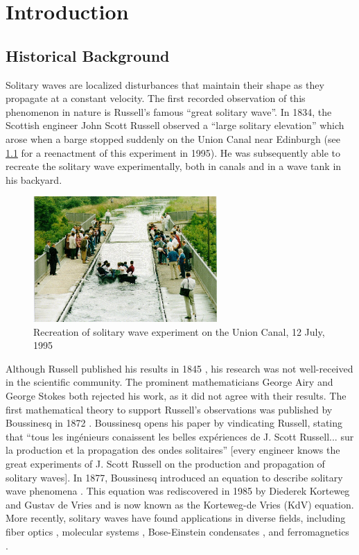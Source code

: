\documentclass[thesis.tex]{subfiles}
\begin{document}
\iffulldocument\else
	\chapter{Introduction}
\fi

\section{Historical Background}

Solitary waves are localized disturbances that maintain their shape as they propagate at a constant velocity. The first recorded observation of this phenomenon in nature is Russell's famous ``great solitary wave''. In 1834, the Scottish engineer John Scott Russell observed a ``large solitary elevation'' which arose when a barge stopped suddenly on the Union Canal near Edinburgh (see \cref{fig:canalwave} for a reenactment of this experiment in 1995). He was subsequently able to recreate the solitary wave experimentally, both in canals and in a wave tank in his backyard.  
\begin{figure}
\begin{center}
\includegraphics[width=7cm]{images/intro/solitonHW.jpg}
\caption[Solitary wave experiment]{Recreation of solitary wave experiment on the Union Canal, 12 July, 1995 \cite{Nature1995} }
\label{fig:canalwave}
\end{center}
\end{figure}

Although Russell published his results in 1845 \cite{russell1845}, his research was not well-received in the scientific community. The prominent mathematicians George Airy and George Stokes both rejected his work, as it did not agree with their results. The first mathematical theory to support Russell's observations was published by Boussinesq in 1872 \cite{Boussinesq1872}. Boussinesq opens his paper by vindicating Russell, stating that ``tous les ing{\'e}nieurs conaissent les belles exp{\'e}riences de J. Scott Russell... sur la production et la propagation des ondes solitaires'' [every engineer knows the great experiments of J. Scott Russell on the production and propagation of solitary waves]. In 1877, Boussinesq introduced an equation to describe solitary wave phenomena \cite{boussinesq1877essai}. This equation was rediscovered in 1985 by Diederek Korteweg and Gustav de Vries \cite{KdVoriginal} and is now known as the Korteweg-de Vries (KdV) equation. More recently, solitary waves have found applications in diverse fields, including fiber optics \cite{Taylor1992}, molecular systems \cite{Davydov1985}, Bose-Einstein condensates \cite{Panos2008BEC}, and ferromagnetics \cite{Kosevich1998}.
\end{document}
